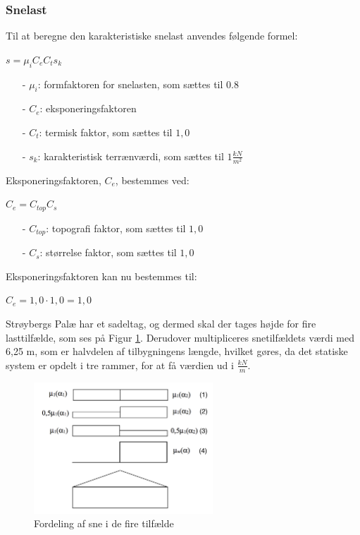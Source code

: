 \subsubsection{Snelast}
Til at beregne den karakteristiske snelast anvendes følgende formel:
\begin{center}
	$s=\mu_iC_eC_ts_k$
\end{center}
\begin{itemize}
	\item[-] $\mu_i$: formfaktoren for snelasten, som sættes til 0.8 \citep[ tabel 5.2 kapitel 5.3]{EU91}
	\item[-] $C_e$: eksponeringsfaktoren
	\item[-] $C_t$: termisk faktor, som sættes til $1,\!0$ \citep[ kapitel 5.2]{EU91}
	\item[-] $s_k$: karakteristisk terrænværdi, som sættes til $1 \frac{kN}{m^2}$ \citep[ kapitel 4.1]{EU91}
\end{itemize}

Eksponeringsfaktoren, $C_e$, bestemmes ved:
\begin{center}
$C_e=C_{top}C_s$
\end{center}
\begin{itemize}
	\item[-] $C_{top}$: topografi faktor, som sættes til $1,\!0$ \citep[ tabel 5.1 kapitel 5.2]{EU91}
	\item[-] $C_s$: størrelse faktor, som sættes til $1,\!0$ \citep[ kapitel 5.2]{EU91}
\end{itemize}
Eksponeringsfaktoren kan nu bestemmes til:
\begin{center}
$C_e=1,\!0\cdot 1,\!0=1,\!0$
\end{center}
Strøybergs Palæ har et sadeltag, og dermed skal der tages højde for fire lasttilfælde, som ses på Figur \ref{fig:sne}. Derudover multipliceres snetilfældets værdi med 6,25 m, som er halvdelen af tilbygningens længde, hvilket gøres, da det statiske system er opdelt i tre rammer, for at få værdien ud i $\frac{kN}{m}$.

\begin{figure}[htbp]
	\centering
	\includegraphics[width=0.6\textwidth]{billeder/snelasttilfaelde.png}
	\caption{Fordeling af sne i de fire tilfælde \citep[ kapitel 5.3.3]{EU91}}
	\label{fig:sne}
\end{figure}

